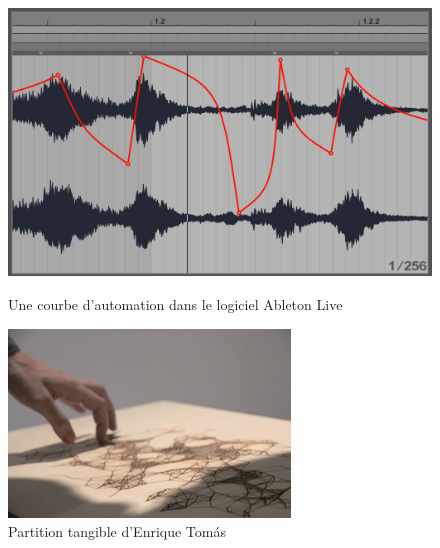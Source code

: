\begin{figure}[!htbp]
	\captionsetup{format=plain}%
	\centering
	\begin{minipage}[t]{0.48\textwidth}
		\includegraphics[width=\linewidth]{gfx/03_gesture/AbletonLiveAutomation_72dpi.png}
		\caption{Une courbe d'automation dans le logiciel Ableton Live}
		\label{fig:gesture:automation}
	\end{minipage}
	\hspace{.02\linewidth}
	\begin{minipage}[t]{0.48\textwidth}
	  \includegraphics[width=\linewidth]{gfx/03_gesture/EnriqueThomas-TangibleScore_72dpi.jpg}
		\caption{Partition tangible d'Enrique Tomás}
		\label{fig:gesture:tangible_score}
	\end{minipage}
\end{figure}

